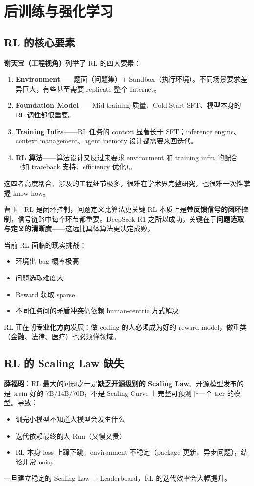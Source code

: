 \section{后训练与强化学习}

\subsection{RL 的核心要素}

\textbf{谢天宝（工程视角）}列举了 RL 的四大要素：
\begin{enumerate}
  \item \textbf{Environment}——题面（问题集）+ Sandbox（执行环境）。不同场景要求差异巨大，有些甚至需要 replicate 整个 Internet。
  \item \textbf{Foundation Model}——Mid-training 质量、Cold Start SFT、模型本身的 RL 调性都很重要。
  \item \textbf{Training Infra}——RL 任务的 context 显著长于 SFT；inference engine、context management、agent memory 设计都需要来回迭代。
  \item \textbf{RL 算法}——算法设计又反过来要求 environment 和 training infra 的配合（如 traceback 支持、efficiency 优化）。
\end{enumerate}
这四者高度耦合，涉及的工程细节极多，很难在学术界完整研究，也很难一次性掌握 know-how。

\begin{importantbox}{曹玉：RL 是闭环控制，问题定义比算法更关键}
RL 本质上是\textbf{带反馈信号的闭环控制}，信号链路中每个环节都重要。DeepSeek R1 之所以成功，关键在于\textbf{问题选取与定义的清晰度}——这远比具体算法更决定成败。

当前 RL 面临的现实挑战：
\begin{itemize}
  \item 环境出 bug 概率极高
  \item 问题选取难度大
  \item Reward 获取 sparse
  \item 不同任务间的矛盾冲突仍依赖 human-centric 方式解决
\end{itemize}
RL 正在朝\textbf{专业化方向}发展：做 coding 的人必须成为好的 reward model，做垂类（金融、法律、医疗）也必须懂领域。
\end{importantbox}

\subsection{RL 的 Scaling Law 缺失}

\textbf{薛福昭}：RL 最大的问题之一是\textbf{缺乏开源级别的 Scaling Law}。开源模型发布的是 train 好的 7B/14B/70B，不是 Scaling Curve 上完整可预测下一个 tier 的模型。导致：
\begin{itemize}
  \item 训完小模型不知道大模型会发生什么
  \item 迭代依赖最终的大 Run（又慢又贵）
  \item RL 本身 loss 上蹿下跳，environment 不稳定（package 更新、异步问题），结论非常 noisy
\end{itemize}
一旦建立稳定的 Scaling Law + Leaderboard，RL 的迭代效率会大幅提升。

